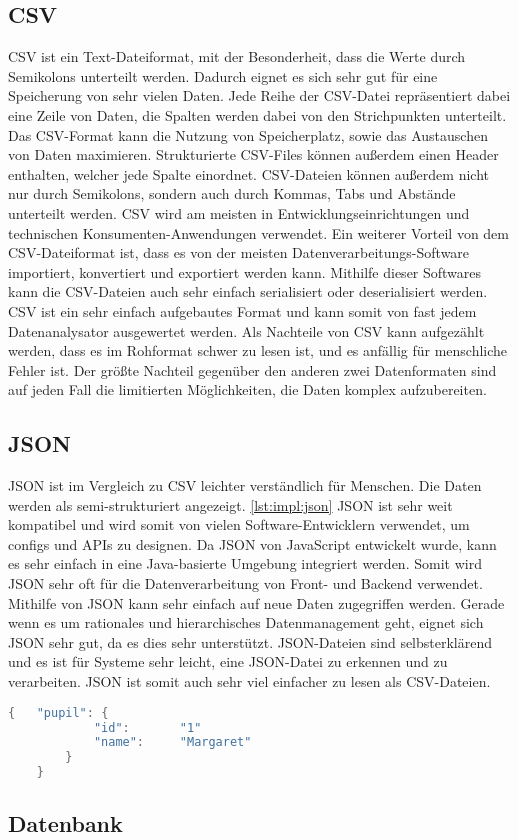 \subsection{CSV}
CSV ist ein Text-Dateiformat, mit der Besonderheit, dass die Werte durch Semikolons unterteilt werden. Dadurch eignet es sich sehr gut für eine Speicherung von sehr vielen Daten. Jede Reihe der CSV-Datei repräsentiert dabei eine Zeile von Daten, die Spalten werden dabei von den Strichpunkten unterteilt. Das CSV-Format kann die Nutzung von Speicherplatz, sowie das Austauschen von Daten maximieren. Strukturierte CSV-Files können außerdem einen Header enthalten, welcher jede Spalte einordnet. CSV-Dateien können außerdem nicht nur durch Semikolons, sondern auch durch Kommas, Tabs und Abstände unterteilt werden. CSV wird am meisten in Entwicklungseinrichtungen und technischen Konsumenten-Anwendungen verwendet. Ein weiterer Vorteil von dem CSV-Dateiformat ist, dass es von der meisten Datenverarbeitungs-Software importiert, konvertiert und exportiert werden kann. Mithilfe dieser Softwares kann die CSV-Dateien auch sehr einfach serialisiert oder deserialisiert werden. CSV ist ein sehr einfach aufgebautes Format und kann somit von fast jedem Datenanalysator ausgewertet werden. Als Nachteile von CSV kann aufgezählt werden, dass es im Rohformat schwer zu lesen ist, und es anfällig für menschliche Fehler ist. Der größte Nachteil gegenüber den anderen zwei Datenformaten sind auf jeden Fall die limitierten Möglichkeiten, die Daten komplex aufzubereiten. \cite{csvOrJson} 


\subsection{JSON}
JSON ist im Vergleich zu CSV leichter verständlich für Menschen. Die Daten werden als semi-strukturiert angezeigt. \ref{lst:impl:json} JSON ist sehr weit kompatibel und wird somit von vielen Software-Entwicklern verwendet, um configs und APIs zu designen. Da JSON von JavaScript entwickelt wurde, kann es sehr einfach in eine Java-basierte Umgebung integriert werden. Somit wird JSON sehr oft für die Datenverarbeitung von Front- und Backend verwendet. Mithilfe von JSON kann sehr einfach auf neue Daten zugegriffen werden. Gerade wenn es um rationales und hierarchisches Datenmanagement geht, eignet sich JSON sehr gut, da es dies sehr unterstützt. JSON-Dateien sind selbsterklärend und es ist für Systeme sehr leicht, eine JSON-Datei zu erkennen und zu verarbeiten. JSON ist somit auch sehr viel einfacher zu lesen als CSV-Dateien. \cite{csvOrJson}


\begin{lstlisting}[language=java,caption=JSON Beispiel,label=lst:impl:json]
    {   "pupil": {
            "id":       "1"
            "name":     "Margaret"
        }
    }
\end{lstlisting}



\subsection{Datenbank}